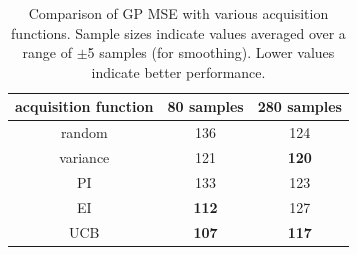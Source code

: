 \documentclass{sig-alternate}
\begin{document}
\begin{table}[tb]
\caption{Comparison of GP MSE with various acquisition functions. 
Sample sizes indicate values averaged over a range of $\pm$5 samples (for smoothing).
Lower values indicate better performance.}
\centering
\begin{tabular}{|c|c|c|}
\hline
acquisition function & 80 samples   & 280 samples  \\ \hline
random                                                        & 136          & 124          \\ \hline
variance                                                      & 121          & \textbf{120} \\ \hline
PI                                                            & 133          & 123          \\ \hline
EI                                                            & \textbf{112} & 127          \\ \hline
UCB                                                           & \textbf{107} & \textbf{117} \\ \hline
\end{tabular}
\label{tab:reg_res}
\end{table}
\end{document}
